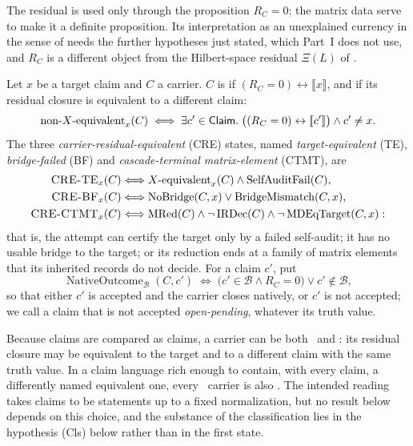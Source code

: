 The residual is used only through the proposition \(R_{C}=0\); the
matrix data serve to make it a definite proposition.  Its
interpretation as an unexplained currency in the sense of
 needs the further hypotheses
just stated, which Part~I does not use, and \(R_{C}\) is a different
object from the Hilbert-space residual \(\Xi(L)\) of
.

\begin{definition}\label{def:four-typed-states}
Let \(x\) be a target claim and \(C\) a carrier.  \(C\) is
\emph{\Xequiv} if \((R_{C}=0)\leftrightarrow\llbracket x\rrbracket\),
and \emph{\nonXequiv} if its residual closure is equivalent to a
different claim:
\[
  \mbox{non-$X$-equivalent}_{x}(C)
  \;\Longleftrightarrow\;
  \exists c'\in\mathsf{Claim}.\;
    \bigl((R_{C}=0)\leftrightarrow[\![ c']\!]\bigr)
    \wedge c'\neq x .
\]
The three \emph{carrier-residual-equivalent} (CRE) states, named
\emph{target-equivalent} (TE), \emph{bridge-failed} (BF) and
\emph{cascade-terminal matrix-element} (CTMT), are
\[
\begin{aligned}
  \mbox{\textup{\textsc{CRE-TE}}}_{x}(C)
    &\Longleftrightarrow
      \mbox{$X$-equivalent}_{x}(C)\wedge\operatorname{SelfAuditFail}(C),\\
  \mbox{\textup{\textsc{CRE-BF}}}_{x}(C)
    &\Longleftrightarrow
      \operatorname{NoBridge}(C,x)\vee\operatorname{BridgeMismatch}(C,x),\\
  \mbox{\textup{\textsc{CRE-CTMT}}}_{x}(C)
    &\Longleftrightarrow
      \operatorname{MRed}(C)\wedge\neg\operatorname{IRDec}(C)
      \wedge\neg\operatorname{MDEqTarget}(C,x):
\end{aligned}
\]
that is, the attempt can certify the target only by a failed
self-audit; it has no usable bridge to the target; or its reduction ends
at a family of matrix elements that its inherited records do not
decide.  For a claim \(c'\), put
\[
  \operatorname{NativeOutcome}_{\mathcal B}(C,c')
  \;\Longleftrightarrow\;
  \bigl(c'\in\mathcal B\wedge R_{C}=0\bigr)\vee c'\notin\mathcal B ,
\]
so that either \(c'\) is accepted and the carrier closes natively, or
\(c'\) is not accepted; we call a claim that is not accepted
\emph{open-pending}, whatever its truth value.
\end{definition}

Because claims are compared as claims, a carrier can be both
\nonXequiv\ and \Xequiv: its residual closure may be equivalent to the
target and to a different claim with the same truth value.  In a claim
language rich enough to contain, with every claim, a differently named
equivalent one, every \Xequiv\ carrier is also \nonXequiv.  The
intended reading takes claims to be statements up to a fixed
normalization, but no result below depends on this choice, and the
substance of the classification lies in the hypothesis (Cls) below
rather than in the first state.

